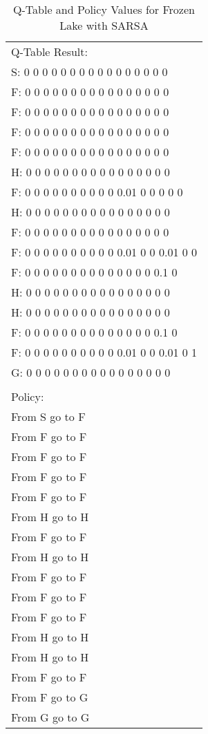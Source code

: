 \documentclass[11pt,letterpaper]{ryersonSGSThesis}
\begin{document}
\begin{ryersonSGSThesis}
    \begin{table}[h!]
    \centering
    \begin{tabular}{|l|} 
        \hline
        Q-Table Result: \\
        S:  0 0 0 0 0 0 0 0 0 0 0 0 0 0 0 0 \\
        F:  0 0 0 0 0 0 0 0 0 0 0 0 0 0 0 0 \\
        F:  0 0 0 0 0 0 0 0 0 0 0 0 0 0 0 0 \\
        F:  0 0 0 0 0 0 0 0 0 0 0 0 0 0 0 0 \\
        F:  0 0 0 0 0 0 0 0 0 0 0 0 0 0 0 0 \\
        H:  0 0 0 0 0 0 0 0 0 0 0 0 0 0 0 0 \\
        F:  0 0 0 0 0 0 0 0 0 0 0.01 0 0 0 0 0 \\ 
        H:  0 0 0 0 0 0 0 0 0 0 0 0 0 0 0 0  \\
        F:  0 0 0 0 0 0 0 0 0 0 0 0 0 0 0 0 \\
        F:  0 0 0 0 0 0 0 0 0 0 0.01 0 0 0.01 0 0 \\ 
        F:  0 0 0 0 0 0 0 0 0 0 0 0 0 0 0.1 0 \\
        H:  0 0 0 0 0 0 0 0 0 0 0 0 0 0 0 0 \\
        H:  0 0 0 0 0 0 0 0 0 0 0 0 0 0 0 0 \\
        F:  0 0 0 0 0 0 0 0 0 0 0 0 0 0 0.1 0 \\
        F:  0 0 0 0 0 0 0 0 0 0 0.01 0 0 0.01 0 1 \\ 
        G:  0 0 0 0 0 0 0 0 0 0 0 0 0 0 0 0 \\
        \\
        Policy: \\
        From S go to F \\
        From F go to F \\
        From F go to F \\
        From F go to F \\
        From F go to F \\
        From H go to H \\
        From F go to F \\
        From H go to H \\
        From F go to F \\
        From F go to F \\
        From F go to F \\
        From H go to H \\
        From H go to H \\
        From F go to F \\
        From F go to G \\
        From G go to G \\
        \hline
    \end{tabular}
    \caption{Q-Table and Policy Values for Frozen Lake with SARSA} \label{table:FrozenLakeSARSAResult}
    \end{table}


\end{ryersonSGSThesis}
\end{document}
